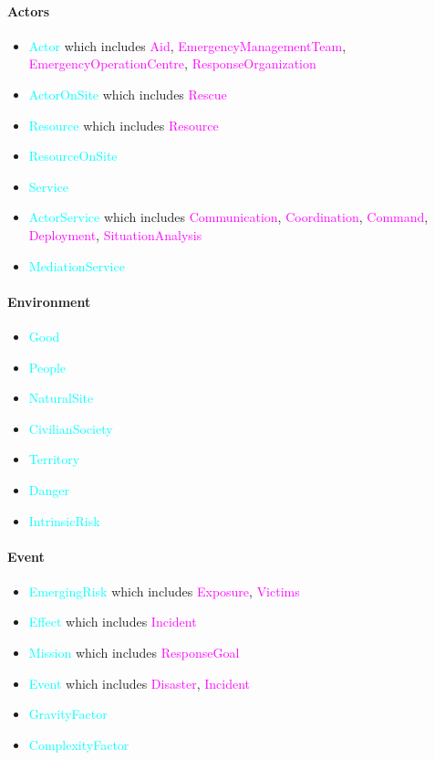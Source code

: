 \label{sec:information-si}
\paragraph{Actors}
\begin{itemize}
    \item \textcolor{cyan}{Actor} which includes \textcolor{magenta}{Aid}, \textcolor{magenta}{EmergencyManagementTeam}, \textcolor{magenta}{EmergencyOperationCentre}, \textcolor{magenta}{ResponseOrganization}
    \item \textcolor{cyan}{ActorOnSite} which includes \textcolor{magenta}{Rescue}
    \item \textcolor{cyan}{Resource} which includes \textcolor{magenta}{Resource}
    \item \textcolor{cyan}{ResourceOnSite}
    \item \textcolor{cyan}{Service}
    \item \textcolor{cyan}{ActorService} which includes \textcolor{magenta}{Communication}, \textcolor{magenta}{Coordination}, \textcolor{magenta}{Command}, \textcolor{magenta}{Deployment}, \textcolor{magenta}{SituationAnalysis}
    \item \textcolor{cyan}{MediationService}
\end{itemize}

\paragraph{Environment}
\begin{itemize}
    \item \textcolor{cyan}{Good}
    \item \textcolor{cyan}{People}
    \item \textcolor{cyan}{NaturalSite}
    \item \textcolor{cyan}{CivilianSociety}
    \item \textcolor{cyan}{Territory}
    \item \textcolor{cyan}{Danger}
    \item \textcolor{cyan}{IntrinsicRisk}
\end{itemize}

\paragraph{Event}
\begin{itemize}
    \item \textcolor{cyan}{EmergingRisk} which includes \textcolor{magenta}{Exposure}, \textcolor{magenta}{Victims}
    \item \textcolor{cyan}{Effect} which includes \textcolor{magenta}{Incident}
    \item \textcolor{cyan}{Mission} which includes \textcolor{magenta}{ResponseGoal}
    \item \textcolor{cyan}{Event} which includes \textcolor{magenta}{Disaster}, \textcolor{magenta}{Incident}
    \item \textcolor{cyan}{GravityFactor}
    \item \textcolor{cyan}{ComplexityFactor}
\end{itemize}


